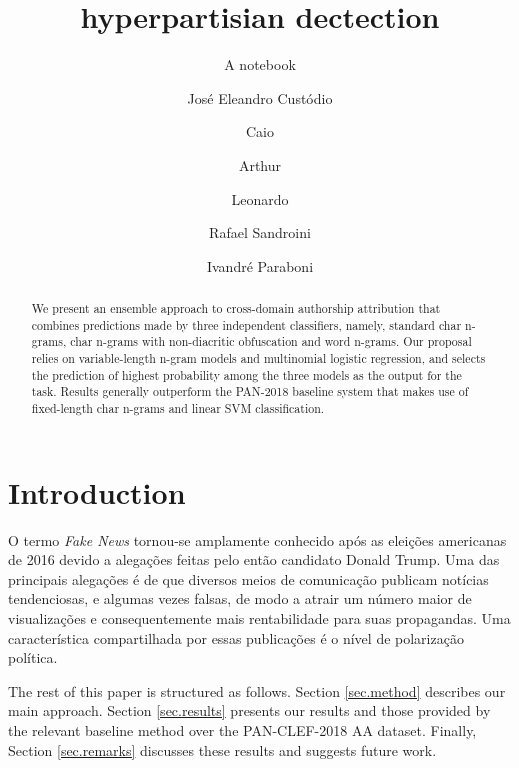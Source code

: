 \documentclass{llncs}
\begin{document}
	
	\title{hyperpartisian dectection}
	\subtitle{A notebook}
	
	\author{Jos\'e Eleandro Cust\'odio
		\and Caio
		\and Arthur
		\and Leonardo
		\and Rafael Sandroini
		\and Ivandr\'e Paraboni}
	
	\maketitle
	
	\begin{abstract}
		We present an ensemble approach to cross-domain authorship attribution that combines predictions made by three independent classifiers, namely, standard char n-grams, char n-grams with non-diacritic obfuscation and word n-grams. Our proposal relies on variable-length n-gram models and multinomial logistic regression, and selects the prediction of highest probability among the three models as the output for the task. Results generally outperform the PAN-2018 baseline system that makes use of fixed-length char n-grams and linear SVM classification.
	\end{abstract}
	
	
	
	\section{Introduction}
	\label{sec.intro}
	
	
	O termo {\it Fake News} tornou-se amplamente conhecido após as eleições americanas de 2016 devido a alegações feitas pelo então candidato Donald Trump. Uma das principais alegações é de que diversos meios de comunicação publicam notícias tendenciosas, e algumas vezes falsas, de modo a atrair um número maior de visualizações e consequentemente mais rentabilidade para suas propagandas. Uma característica compartilhada por essas publicações é o nível de polarização política.
	
	
	
	
	The rest of this paper is structured as follows. Section \ref{sec.method} describes our main approach. Section \ref{sec.results} presents our results and those provided by the relevant baseline method over the PAN-CLEF-2018 AA dataset. Finally, Section \ref{sec.remarks} discusses these results and suggests future work.
	
\end{document}

